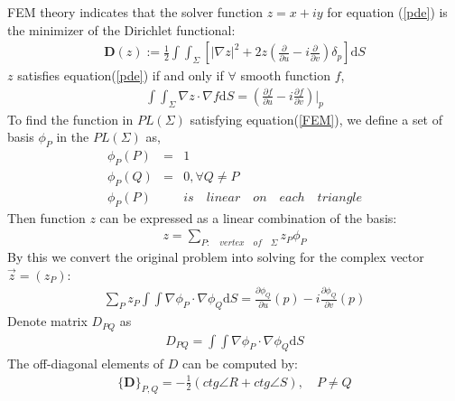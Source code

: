 \documentclass{InsightArticle}
\begin{document}
  FEM theory indicates that the solver function $z=x+iy$ for equation
  (\ref{pde}) is the minimizer of the Dirichlet functional:
  \begin{eqnarray}  
      \mathbf{D}(z):=\frac{1}{2}\int\int_{\Sigma}[ |\nabla z|^2 + 2z (\frac{\partial}{\partial u} - i\frac{\partial}{\partial v})\delta_p ]\mathrm{d}S \label{DirichletFunctional}
  \end{eqnarray}      
  $z$ satisfies equation(\ref{pde}) if and only if $\forall$ smooth
  function $f$,
  \begin{eqnarray}  
      \int\int_{\Sigma} \nabla z \cdot \nabla f \mathrm{d}S = (\frac{\partial f}{\partial u} - i\frac{\partial f}{\partial v})|_p \label{FEM}
  \end{eqnarray}    
  To find the function in $PL(\Sigma)$ satisfying equation(\ref{FEM}),
  we define a set of basis $\phi_P$ in the $PL(\Sigma)$ as,
  \begin{eqnarray}  
      \phi_P(P) &=& 1 \nonumber \\
      \phi_P(Q) &=& 0, \forall Q \ne P \nonumber \\
      \phi_P(P) && is \quad linear \quad on \quad each \quad triangle \label{basis}
  \end{eqnarray}  
  Then function $z$ can be expressed as a linear combination of the
  basis:
  \begin{eqnarray}  
      z = \sum_{P:\quad vertex \quad of \quad \Sigma} z_P \phi_P \label{zInBasis}
  \end{eqnarray}  
  By this we convert the original problem into solving for the complex
  vector $\vec{z}=(z_P)$:
   \begin{eqnarray}  
      \sum_P z_P \int\int \nabla \phi_P \cdot \nabla \phi_Q \mathrm{d}S = \frac{\partial \phi_Q}{\partial u}(p) - i \frac{\partial \phi_Q}{\partial v}(p)
      \label{allQ}
  \end{eqnarray}  
  Denote matrix $D_{PQ}$ as
   \begin{eqnarray}  
      D_{PQ} = \int\int \nabla \phi_P \cdot \nabla \phi_Q \mathrm{d}S  \label{Dpq}
  \end{eqnarray}  
  The off-diagonal elements of $D$ can be computed by:
   \begin{eqnarray}  
      \{ \mathbf{D} \}_{P,Q } = -\frac{1}{2}(ctg\angle R + ctg\angle S), \quad P \ne Q  \label{ctg}
  \end{eqnarray}  
\end{document}
